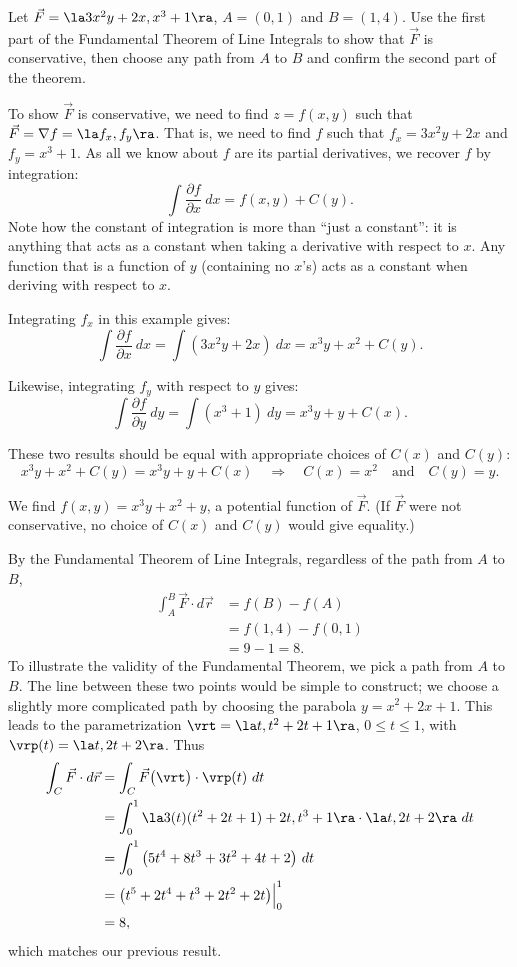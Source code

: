 {Let $\vec F = \la 3x^2y+2x, x^3+1\ra$, $A = (0,1)$ and $B = (1,4)$. Use the first part of the Fundamental Theorem of Line Integrals to show that $\vec F$ is conservative, then choose any path from $A$ to $B$ and confirm the second part of the theorem.
}
{To show $\vec F$ is conservative, we need to find $z = f(x,y)$ such that $\vec F = \nabla f = \la f_x, f_y\ra$. That is, we need to find $f$ such that $f_x = 3x^2y+2x$ and $f_y = x^3+1$. As all we know about $f$ are its partial derivatives, we recover $f$ by integration:
\[
\int \frac{\partial f}{\partial x}\ dx = f(x,y) + C(y).
\]
Note how the constant of integration is more than ``just a constant'': it is anything that acts as a constant when taking a derivative with respect to $x$. Any function that is a function of $y$ (containing no $x$'s) acts as a constant when deriving with respect to $x$.

Integrating $f_x$ in this example gives:
\[
\int \frac{\partial f}{\partial x}\ dx = \int (3x^2y+2x)\ dx = x^3y+x^2 + C(y).
\]

Likewise, integrating $f_y$ with respect to $y$ gives:
\[
\int \frac{\partial f}{\partial y}\ dy = \int( x^3+1)\ dy = x^3y+ y + C(x).
\]

These two results should be equal with appropriate choices of $C(x)$ and $C(y)$:
\[
x^3y+x^2 + C(y) = x^3y+ y + C(x)\quad \Rightarrow\quad C(x) = x^2 \quad \text{and}\quad C(y) = y.
\]

We find $f(x,y) = x^3y+x^2+y$, a potential function of $\vec F$. (If $\vec F$ were not conservative, no choice of $C(x)$ and $C(y)$ would give equality.)

By the Fundamental Theorem of Line Integrals, regardless of the path from $A$ to $B$, 
\begin{align*}
\int_A^B\vec F\cdot d\vec r &= f(B) - f(A) \\
			&= f(1,4) - f(0,1) \\
			&= 9 - 1 = 8.
\end{align*}
To illustrate the validity of the Fundamental Theorem, we pick a path from $A$ to $B$. The line between these two points would be simple to construct; we choose a slightly more complicated path by choosing the parabola $y = x^2+2x+1$. This leads to the parametrization $\vrt = \la t, t^2+2t+1\ra$, $0\leq t\leq 1$, with $\vrp(t) = \la t, 2t+2\ra$. Thus
\begin{align*}
\int_C \vec F\cdot d\vec r &= \int_C\vec F\big(\vrt\big)\cdot\vrp(t)\ dt\\
				&= \int_0^1\la 3(t)(t^2+2t+1)+2t, t^3+1\ra\cdot\la t,2t+2\ra\ dt\\
				&= \int_0^1 \big(5t^4+8t^3+3t^2+4t+2\big)\ dt\\
				&= \big(t^5+2t^4+t^3+2t^2+2t\big)\Big|_0^1\\
				&= 8,
\end{align*}				
which matches our previous result.
}\\

